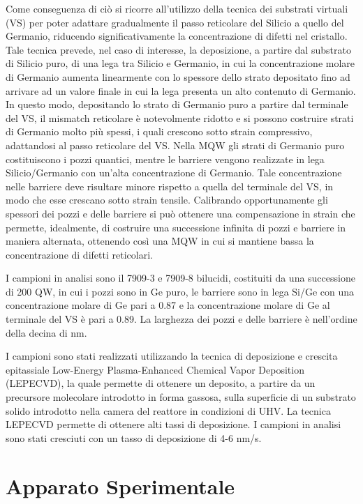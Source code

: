 \documentclass[journal]{IEEEtran}
\begin{document}
Come conseguenza di ciò si ricorre all'utilizzo della tecnica dei substrati virtuali (VS) per poter adattare gradualmente il passo reticolare del Silicio a quello del Germanio, riducendo significativamente la concentrazione di difetti nel cristallo. Tale tecnica prevede, nel caso di interesse, la deposizione, a partire dal substrato di Silicio puro, di una lega tra Silicio e Germanio, in cui la concentrazione molare di Germanio aumenta linearmente con lo spessore dello strato depositato fino ad arrivare ad un valore finale in cui la lega presenta un alto contenuto di Germanio. In questo modo, depositando lo strato di Germanio puro a partire dal terminale del VS, il mismatch reticolare è notevolmente ridotto e si possono costruire strati di Germanio molto più spessi, i quali crescono sotto strain compressivo, adattandosi al passo reticolare del VS. Nella MQW gli strati di Germanio puro costituiscono i pozzi quantici, mentre le barriere vengono realizzate in lega Silicio/Germanio con un'alta concentrazione di Germanio. Tale concentrazione nelle barriere deve risultare minore rispetto a quella del terminale del VS, in modo che esse crescano sotto strain tensile. Calibrando opportunamente gli spessori dei pozzi e delle barriere si può ottenere una compensazione in strain che permette, idealmente, di costruire una successione infinita di pozzi e barriere in maniera alternata, ottenendo così una MQW in cui si mantiene bassa la concentrazione di difetti reticolari.

I campioni in analisi sono il 7909-3 e 7909-8 bilucidi, costituiti da una successione di 200 QW, in cui i pozzi sono in Ge puro, le barriere sono in lega Si/Ge con una concentrazione molare di Ge pari a 0.87 e la concentrazione molare di Ge al terminale del VS è pari a 0.89. La larghezza dei pozzi e delle barriere è nell'ordine della decina di nm.

I campioni sono stati realizzati utilizzando la tecnica di deposizione e crescita epitassiale Low-Energy Plasma-Enhanced Chemical Vapor Deposition (LEPECVD), la quale permette di ottenere un deposito, a partire da un precursore molecolare introdotto in forma gassosa, sulla superficie di un substrato solido introdotto nella camera del reattore in condizioni di UHV.
La tecnica LEPECVD permette di ottenere alti tassi di deposizione. I campioni in analisi sono stati cresciuti con un tasso di deposizione di 4-6 nm/s.


\section{Apparato Sperimentale}
\end{document}
